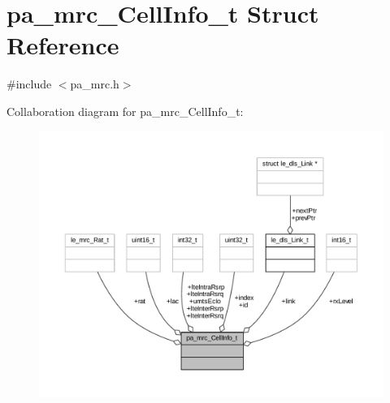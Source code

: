 \hypertarget{structpa__mrc___cell_info__t}{}\section{pa\+\_\+mrc\+\_\+\+Cell\+Info\+\_\+t Struct Reference}
\label{structpa__mrc___cell_info__t}


{\ttfamily \#include $<$pa\+\_\+mrc.\+h$>$}



Collaboration diagram for pa\+\_\+mrc\+\_\+\+Cell\+Info\+\_\+t\+:
\nopagebreak
\begin{figure}[H]
\begin{center}
\leavevmode
\includegraphics[width=350pt]{structpa__mrc___cell_info__t__coll__graph}
\end{center}
\end{figure}
